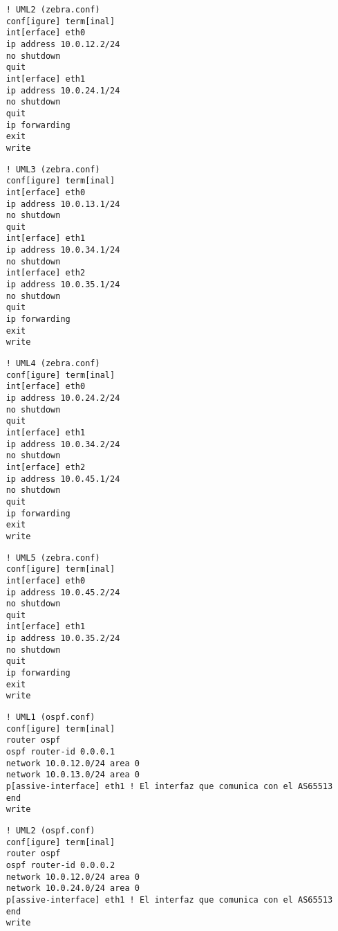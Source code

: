   \begin{verbatim}
    ! UML2 (zebra.conf)
    conf[igure] term[inal]
    int[erface] eth0
    ip address 10.0.12.2/24
    no shutdown
    quit
    int[erface] eth1
    ip address 10.0.24.1/24
    no shutdown
    quit
    ip forwarding
    exit
    write
  \end{verbatim}

  \begin{verbatim}
    ! UML3 (zebra.conf)
    conf[igure] term[inal]
    int[erface] eth0
    ip address 10.0.13.1/24
    no shutdown
    quit
    int[erface] eth1
    ip address 10.0.34.1/24
    no shutdown
    int[erface] eth2
    ip address 10.0.35.1/24
    no shutdown
    quit
    ip forwarding
    exit
    write
  \end{verbatim}

  \begin{verbatim}
    ! UML4 (zebra.conf)
    conf[igure] term[inal]
    int[erface] eth0
    ip address 10.0.24.2/24
    no shutdown
    quit
    int[erface] eth1
    ip address 10.0.34.2/24
    no shutdown
    int[erface] eth2
    ip address 10.0.45.1/24
    no shutdown
    quit
    ip forwarding
    exit
    write
  \end{verbatim}

  \begin{verbatim}
    ! UML5 (zebra.conf)
    conf[igure] term[inal]
    int[erface] eth0
    ip address 10.0.45.2/24
    no shutdown
    quit
    int[erface] eth1
    ip address 10.0.35.2/24
    no shutdown
    quit
    ip forwarding
    exit
    write
  \end{verbatim}

  \begin{verbatim}
    ! UML1 (ospf.conf)
    conf[igure] term[inal]
    router ospf
    ospf router-id 0.0.0.1
    network 10.0.12.0/24 area 0
    network 10.0.13.0/24 area 0
    p[assive-interface] eth1 ! El interfaz que comunica con el AS65513
    end
    write
  \end{verbatim}

  \begin{verbatim}
    ! UML2 (ospf.conf)
    conf[igure] term[inal]
    router ospf
    ospf router-id 0.0.0.2
    network 10.0.12.0/24 area 0
    network 10.0.24.0/24 area 0
    p[assive-interface] eth1 ! El interfaz que comunica con el AS65513
    end
    write
  \end{verbatim}

